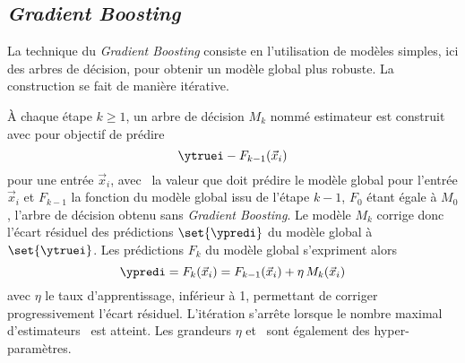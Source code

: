 \subsection{\emph{Gradient Boosting}}\label{chapter-ML-section-XGB-grad_boost}
La technique du \emph{Gradient Boosting} consiste en
l'utilisation de modèles simples,
ici des arbres de décision,
pour obtenir un modèle global plus robuste.
La construction se fait de manière itérative.
\par
À chaque étape $k\geq1$,
un arbre de décision $M_k$ nommé estimateur est construit avec pour objectif de prédire
\begin{equation}
\ytruei - F_{k-1}(\vec{x}_i)
\end{equation}
pour une entrée $\vec{x}_i$,
avec
\ytruei\ la valeur que doit prédire le modèle global pour l'entrée $\vec{x}_i$
et
$F_{k-1}$ la fonction du modèle global issu de l'étape ${k-1}$,
$F_0$ étant égale à $M_0$, l'arbre de décision obtenu sans \emph{Gradient Boosting}.
Le modèle $M_k$ corrige donc l'écart résiduel des prédictions $\set{\ypredi}$ du modèle global à $\set{\ytruei}$.
Les prédictions $F_k$ du modèle global s'expriment alors
\begin{equation}
\ypredi = F_k(\vec{x}_i) = F_{k-1}(\vec{x}_i) + \eta\,M_k(\vec{x}_i)
\end{equation}
avec
$\eta$ le taux d'apprentissage, inférieur à 1, permettant de corriger progressivement l'écart résiduel.
L'itération s'arrête lorsque le nombre maximal d'estimateurs \Nestimators\ est atteint.
Les grandeurs $\eta$ et \Nestimators\ sont également des hyper-paramètres.
